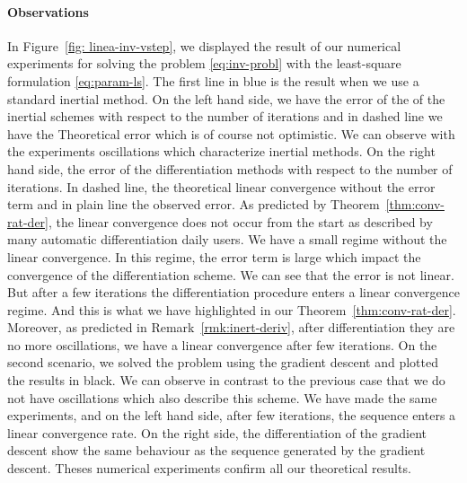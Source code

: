 \paragraph{Observations }  In Figure~\ref{fig: linea-inv-vstep}, we  displayed the result of our numerical experiments for solving the problem \eqref{eq:inv-probl}  with the least-square formulation \eqref{eq:param-ls}. The first line in blue is the result when we use a standard inertial method. On the left hand side, we have the  error of the of the inertial schemes with respect to the number of iterations and in dashed line we have the Theoretical error which is of course not optimistic. We can  observe with the experiments oscillations which characterize inertial methods. On the right hand side, the error of the differentiation methods with respect to the number of iterations. In dashed line, the theoretical linear convergence without the error term and in plain line the observed error.  As predicted by Theorem~\ref{thm:conv-rat-der}, the linear convergence does not occur from the start as described by many automatic differentiation daily users. We have a small regime without the linear convergence. In this regime, the error term is large which impact the convergence of the differentiation scheme.  We can see that the error is not linear. But after a few iterations the differentiation procedure enters a linear convergence regime. And  this is what we have highlighted in our Theorem~\ref{thm:conv-rat-der}. Moreover, as predicted in Remark~\ref{rmk:inert-deriv}, after differentiation they are no more oscillations, we have a linear convergence after few iterations. On the second scenario, we solved the problem using the gradient descent and plotted the results in black. We  can observe in contrast to the previous case that we  do not have oscillations which also describe this scheme. We have made the same experiments, and on the left hand side, after few iterations, the sequence enters a linear convergence rate. On the right side, the differentiation of the gradient descent show the same behaviour as the  sequence generated by the gradient descent. Theses numerical experiments confirm all our theoretical results.  
